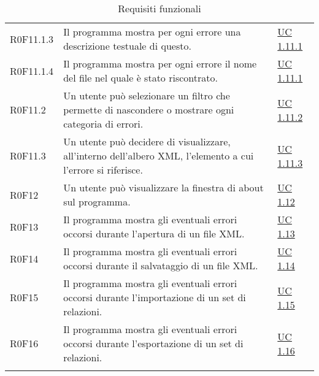 \begin{center}
\begin{longtable}{p{4.2cm}!{\color{white}\vrule width 0.5mm}p{6cm}!{\color{white}\vrule width 0.5mm}p{2.5cm}!{\color{white}\vrule width 0.5mm}}
				\hspace{4mm}\hypertarget{XER0F11.1.3}{R0F11.1.3} & Il programma mostra per ogni errore una descrizione testuale di questo. & \hyperref[subsec:XEUC1.11.1]{UC 1.11.1}\\
				
				\hspace{4mm}\hypertarget{XER0F11.1.4}{R0F11.1.4} & Il programma mostra per ogni errore il nome del file nel quale è stato riscontrato. & \hyperref[subsec:XEUC1.11.1]{UC 1.11.1}\\
		
			\hspace{2mm}\hypertarget{XER0F11.2}{R0F11.2} & Un utente può selezionare un filtro che permette di nascondere o mostrare ogni categoria di errori. & \hyperref[subsec:XEUC1.11.2]{UC 1.11.2}\\
			
			\hspace{2mm}\hypertarget{XER0F11.3}{R0F11.3} & Un utente può decidere di visualizzare, all'interno dell'albero XML, l'elemento a cui l'errore si riferisce. & \hyperref[subsec:XEUC1.11.3]{UC 1.11.3}\\
		
		
		\hspace{0mm}\hypertarget{XER0F12}{R0F12} & Un utente può visualizzare la finestra di about sul programma. & \hyperref[subsec:XEUC1.12]{UC 1.12}\\
		
		
		\hspace{0mm}\hypertarget{XER0F13}{R0F13} & Il programma mostra gli eventuali errori occorsi durante l'apertura di un file XML. & \hyperref[subsec:XEUC1.13]{UC 1.13}\\
		
		\hspace{0mm}\hypertarget{XER0F14}{R0F14} & Il programma mostra gli eventuali errori occorsi durante il salvataggio di un file XML. & \hyperref[subsec:XEUC1.14]{UC 1.14}\\
		
		\hspace{0mm}\hypertarget{XER0F15}{R0F15} & Il programma mostra gli eventuali errori occorsi durante l'importazione di un set di relazioni. & \hyperref[subsec:XEUC1.15]{UC 1.15}\\
		
		\hspace{0mm}\hypertarget{XER0F16}{R0F16} & Il programma mostra gli eventuali errori occorsi durante l'esportazione di un set di relazioni. & \hyperref[subsec:XEUC1.16]{UC 1.16}\\
		
		\hline
		\caption{Requisiti funzionali}
	\end{longtable}
\end{center}


